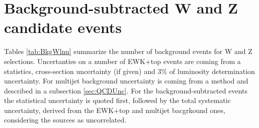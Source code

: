 \section{Background-subtracted W and Z candidate events}

Tables \ref{tab:BkgWlnu} summarize the number of background events for W and Z selections. Uncertanties on a number of EWK+top events are coming from a statistics, cross-section uncertainty (if given) and 3\% of luminosity determination uncertainty. For multijet background uncertainty is coming from a method and described in a subsection \ref{sec:QCDUnc}. For the background-subtracted events the statistical uncertainty is quoted first, followed by the total systematic uncertainty, derived from the EWK+top and multijet bacgrkound ones, considering the sources as uncorrelated. 



